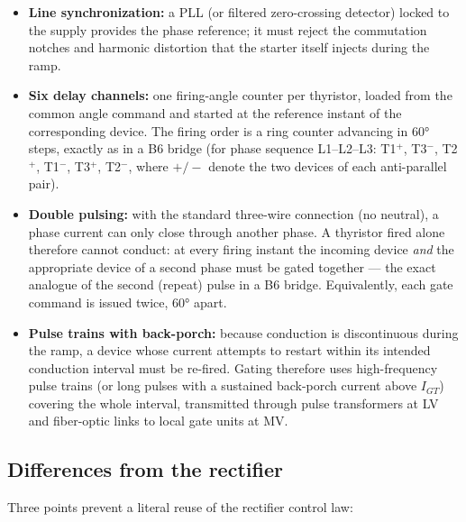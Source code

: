 \documentclass[11pt,a4paper]{article}
\begin{document}
\begin{itemize}
  \item \textbf{Line synchronization:} a PLL (or filtered zero-crossing
        detector) locked to the supply provides the phase reference; it must
        reject the commutation notches and harmonic distortion that the
        starter itself injects during the ramp.
  \item \textbf{Six delay channels:} one firing-angle counter per thyristor,
        loaded from the common angle command and started at the reference
        instant of the corresponding device. The firing order is a ring
        counter advancing in \ang{60} steps, exactly as in a B6 bridge
        (for phase sequence L1--L2--L3:
        T1$^{+}$, T3$^{-}$, T2$^{+}$, T1$^{-}$, T3$^{+}$, T2$^{-}$, where
        $+/-$ denote the two devices of each anti-parallel pair).
  \item \textbf{Double pulsing:} with the standard three-wire connection
        (no neutral), a phase current can only close through another phase.
        A thyristor fired alone therefore cannot conduct: at every firing
        instant the incoming device \emph{and} the appropriate device of a
        second phase must be gated together --- the exact analogue of the
        second (repeat) pulse in a B6 bridge. Equivalently, each gate
        command is issued twice, \ang{60} apart.
  \item \textbf{Pulse trains with back-porch:} because conduction is
        discontinuous during the ramp, a device whose current attempts to
        restart within its intended conduction interval must be re-fired.
        Gating therefore uses high-frequency pulse trains (or long pulses
        with a sustained back-porch current above $I_{GT}$) covering the
        whole interval, transmitted through pulse transformers at LV and
        fiber-optic links to local gate units at MV.
\end{itemize}

\subsection{Differences from the rectifier}

Three points prevent a literal reuse of the rectifier control law:
\end{document}
